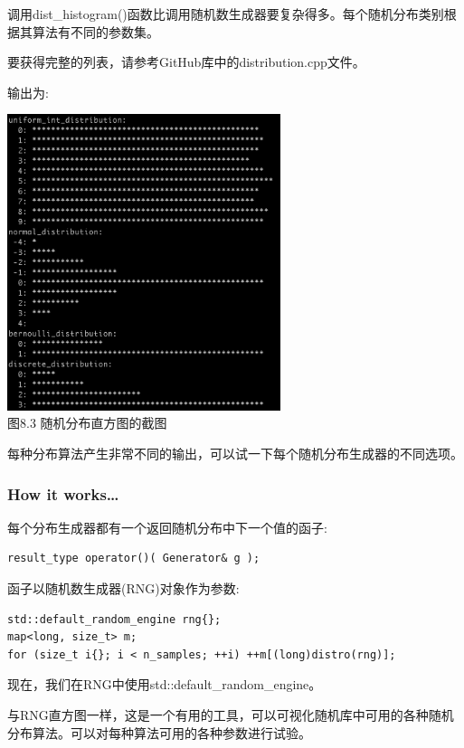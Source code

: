 \begin{itemize}
调用dist\_histogram()函数比调用随机数生成器要复杂得多。每个随机分布类别根据其算法有不同的参数集。

要获得完整的列表，请参考GitHub库中的distribution.cpp文件。

输出为:

\begin{center}
\includegraphics[width=0.6\textwidth]{content/chapter8/images/3.png}\\
图8.3 随机分布直方图的截图
\end{center}

每种分布算法产生非常不同的输出，可以试一下每个随机分布生成器的不同选项。

\end{itemize}

\subsubsection{How it works…}

每个分布生成器都有一个返回随机分布中下一个值的函子:

\begin{lstlisting}[style=styleCXX]
result_type operator()( Generator& g );
\end{lstlisting}

函子以随机数生成器(RNG)对象作为参数:

\begin{lstlisting}[style=styleCXX]
std::default_random_engine rng{};
map<long, size_t> m;
for (size_t i{}; i < n_samples; ++i) ++m[(long)distro(rng)];
\end{lstlisting}

现在，我们在RNG中使用std::default\_random\_engine。

与RNG直方图一样，这是一个有用的工具，可以可视化随机库中可用的各种随机分布算法。可以对每种算法可用的各种参数进行试验。











